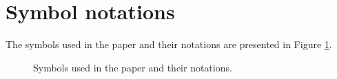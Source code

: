 \documentclass[letterpaper]{article}
\begin{document}
%





\newtheorem{Theorem}{\bf{Theorem}}
\newtheorem{Assumption}{\bf{Assumption}}
\newtheorem{Lemma}{\bf{Lemma}}
\newtheorem{Corollary}{\bf{Corollary}}

\section{Symbol notations}
\label{sect_notations}
The symbols used in the paper and their notations are presented in Figure \ref{symbol_notations}. 
\begin{figure}
\centering
{}
\caption{Symbols used in the paper and their notations.}
\label{symbol_notations}
\end{figure}
\end{document}
